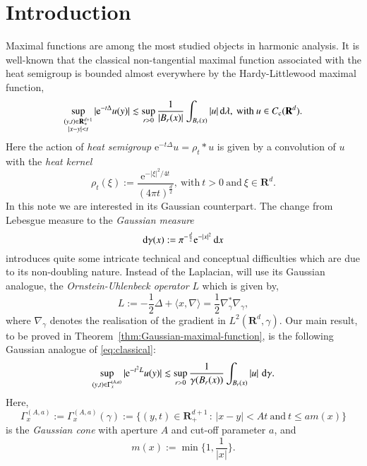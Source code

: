 \documentclass[preprint,12pt]{elsarticle}
\theoremstyle{remark}
\newcommand{\D}{\,\textup{d}}
\newcommand{\la}{\langle}
\newcommand{\ra}{\rangle}
\newcommand{\LHG}{{L^2(\R^d,\gamma)}}
\newcommand{\CcR}{{C_{\text{c}}(\R^d)}}
\renewcommand{\leq}{\leqslant}
\newcommand{\R}{\mathbf R}
\newcommand{\e}{\mathrm{e}} %
\begin{document}


\section{Introduction}
Maximal functions are among the most studied objects in harmonic
analysis. 
It is well-known that the classical non-tangential maximal function associated
with the heat semigroup is bounded almost everywhere by the Hardy-Littlewood
maximal function,
\begin{equation}\label{eq:classical}
  \sup_{\substack{(y, t) \in   \R^{d + 1}_+\\ |x - y| < t}} |\e^{-t \Delta} u(y)| \lesssim \sup_{r
    > 0}  \frac1{|B_r(x)|}\int_{B_r(x)} |u| \D\lambda, \:\text{with}\: u \in \CcR.
\end{equation}
Here the action of \emph{heat semigroup} $\e^{-t \Delta} u = \rho_t \ast u$ is
given by a convolution of $u$ with the \emph{heat kernel}
\begin{equation*}
  \rho_t(\xi) := \frac{\e^{-|\xi|^2/4t}}{(4\pi t)^{\frac{d}2}}, \:\text{with}\:
  t > 0 \:\text{and}\: \xi \in \R^d.
\end{equation*}
In this note we are interested in its Gaussian counterpart. The change from
Lebesgue measure to the \textit{Gaussian measure}
\begin{equation}
  \label{eq:Gaussian-measure}
  \mathrm{d}\gamma(x) := \pi^{-\frac{d}2} \e^{-|x|^2} \D{x}
\end{equation}
introduces quite some intricate technical and conceptual difficulties which are
due to its non-doubling nature. Instead of the Laplacian, will use its Gaussian
analogue, the \emph{Ornstein-Uhlenbeck operator} $L$ which is given by,
\begin{equation}
  \label{eq:Ornstein-Uhlenbeck-operator}
  L := -\frac12 \Delta + \la x, \nabla \ra = \frac12 \nabla_\gamma^* \nabla_\gamma,
\end{equation}
where $\nabla_\gamma$ denotes the realisation of the gradient in $\LHG$.
Our main result, to be proved in Theorem~\ref{thm:Gaussian-maximal-function},
is the following Gaussian analogue of \eqref{eq:classical}:
\begin{equation}
  \label{eq:main}
  \sup_{(y, t) \in \Gamma_x^{(A, a)}} |\e^{-t^2 L} u(y)| \lesssim \sup_{r > 0}
  \frac1{\gamma(B_r(x))}\int_{B_r(x)} |u| \, \D\gamma.
\end{equation}
Here, 
\begin{equation}
  \label{eq:Gaussian-cone}
  \Gamma_x^{(A, a)} := \Gamma_x^{(A, a)}(\gamma) := \{(y, t) \in \R^{d + 1}_+
  \,: \, |x - y| < At \:\text{and}\: t \leq a m(x)\}
\end{equation}
is the \textit{Gaussian cone} with aperture $A$ and cut-off parameter $a$, and
\begin{equation}\label{eq:m-function}
  m(x) := \min\biggl\{1, \frac1{|x|} \biggr\}.
\end{equation}
\end{document}
